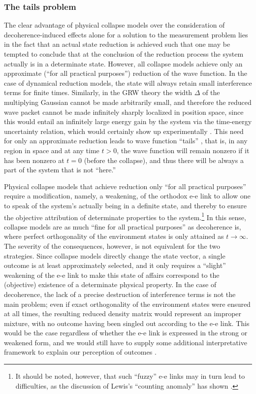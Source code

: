 \documentclass[rmp,aps,amsmath,amsfonts,noshowkeys,noshowpacs,12pt]{revtex4}
\begin{document}
\subsubsection{The tails problem}

The clear advantage of physical collapse models over the consideration
of decoherence-induced effects alone for a solution to the measurement
problem lies in the fact that an actual state reduction is achieved
such that one may be tempted to conclude that at the conclusion of the
reduction process the system actually is in a determinate state.
However, all collapse models achieve only an approximate (``for all
practical purposes'') reduction of the wave function.  In the case of
dynamical reduction models, the state will always retain small
interference terms for finite times.  Similarly, in the GRW theory the
width $\Delta$ of the multiplying Gaussian cannot be made arbitrarily
small, and therefore the reduced wave packet cannot be made infinitely
sharply localized in position space, since this would entail an
infinitely large energy gain by the system via the time-energy
uncertainty relation, which would certainly show up experimentally
\citetext{\citealp{Ghirardi:1986:ud}, chose $\Delta \approx
  10^{-5}~\text{cm}$}. This need for only an approximate reduction
leads to wave function ``tails'' \citep{Albert:1996:po}, that is, in
any region in space and at any time $t>0$, the wave function will
remain nonzero if it has been nonzero at $t=0$ (before the collapse),
and thus there will be always a part of the system that is not
``here.''

Physical collapse models that achieve reduction only ``for all
practical purposes'' require a modification, namely, a weakening, of
the orthodox {e-e} link to allow one to speak of the system's actually
being in a definite state, and thereby to ensure the objective
attribution of determinate properties to the system.\footnote{It
  should be noted, however, that such ``fuzzy'' {e-e} links may in
  turn lead to difficulties, as the discussion of Lewis's ``counting
  anomaly'' has shown \citep{Lewis:1997:ta}.} In this sense, collapse
models are as much ``fine for all practical purposes'' \citep[to
paraphrase][]{Bell:1990:po} as decoherence is, where perfect
orthogonality of the environment states is only attained as $t
\rightarrow \infty$.  The severity of the consequences, however, is
not equivalent for the two strategies. Since collapse models directly
change the state vector, a single outcome is at least approximately
selected, and it only requires a ``slight'' weakening of the {e-e}
link to make this state of affairs correspond to the (objective)
existence of a determinate physical property. In the case of
decoherence, the lack of a precise destruction of interference terms
is not the main problem; even if exact orthogonality of the
environment states were ensured at all times, the resulting reduced
density matrix would represent an improper mixture, with no outcome
having been singled out according to the {e-e} link. This would be the
case regardless of whether the {e-e} link is expressed in the strong
or weakened form, and we would still have to supply some additional
interpretative framework to explain our perception of outcomes
\citep[see also the comment by][]{Ghirardi:1987:po}.
\end{document}
